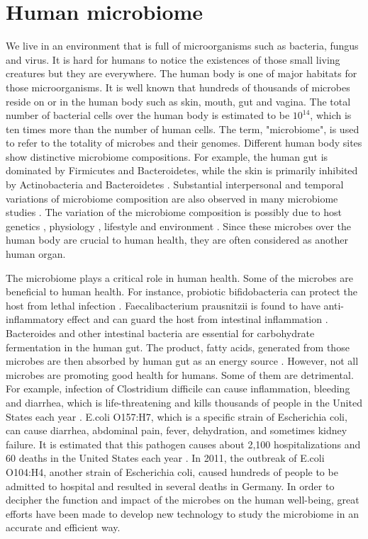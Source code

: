  \label{chpt:intro}

\section{Human microbiome}
We  live in an environment that is full of microorganisms such as bacteria, fungus and virus. It is hard for humans to notice the existences of those small living creatures but they are everywhere.  The human body is one of major habitats for those microorganisms. It is well known that hundreds of thousands of microbes reside  on or in the human body such as skin, mouth, gut and vagina. The total number of bacterial cells over the human body is estimated to be $10^{14}$, which is ten times more than the number of human cells. The term, "microbiome", is used to refer to the totality of microbes and their genomes. Different human body sites show distinctive microbiome compositions. For example, the human gut is dominated by Firmicutes and Bacteroidetes, while the skin is primarily inhibited by Actinobacteria and Bacteroidetes \citep{Cho:2012cn}. Substantial interpersonal and temporal variations of microbiome composition are also observed in many microbiome studies \citep{turnbaugh2007human}. The variation of the microbiome composition is possibly due to host genetics \citep{Knights:2014jta}, physiology \citep{Sommer:2013hq}, lifestyle \citep{wu2011linking} and environment \citep{Adams:2015ga}. Since these  microbes over the human body are crucial to human health, they are often considered as another human organ.

The microbiome plays a critical role in human health. Some of the microbes are beneficial to human health. For instance, probiotic bifidobacteria can protect the host from lethal infection \citep{Fukuda:2012hg}. Faecalibacterium prausnitzii is found to have anti-inflammatory effect and can guard the host from intestinal inflammation \citep{Sokol:2008ke}. Bacteroides and other intestinal bacteria are essential for carbohydrate fermentation in the human gut. The product, fatty acids, generated from those microbes are then absorbed by human gut as an energy source \citep{Wexler:2007cn}. However, not all microbes are promoting good health for humans. Some of them are detrimental. For example, infection of Clostridium difficile can cause inflammation, bleeding and diarrhea, which is life-threatening and kills thousands of people in the United States each year \citep{Lessa:2015wl}. E.coli O157:H7, which is a specific strain of Escherichia coli, can cause diarrhea, abdominal pain, fever, dehydration, and sometimes kidney failure. It is estimated that this pathogen causes about 2,100 hospitalizations and 60 deaths in the United States each year \citep{Berkenpas:2006wl}. In 2011, the outbreak of  E.coli O104:H4, another strain of Escherichia coli,  caused hundreds of people to be admitted to hospital and resulted in several deaths in Germany. In order to decipher the function and impact of the microbes on the human well-being, great efforts have been made to develop new technology to study the microbiome in an accurate and efficient way.

